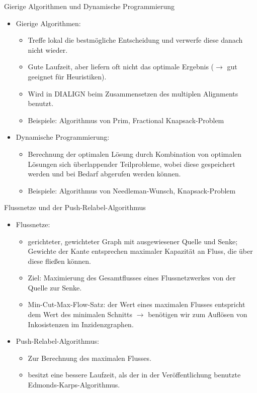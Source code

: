 \documentclass[wide,xcolor={x11names},hyperref={colorlinks=false},pantone312]{beamer}
\begin{document}
\begin{frame}[t]{Gierige Algorithmen und Dynamische Programmierung}
	\begin{itemize}
		\item Gierige Algorithmen:
		\begin{itemize}
			\item Treffe lokal die bestmögliche Entscheidung und verwerfe diese danach nicht wieder.
			\item Gute Laufzeit, aber liefern oft nicht das optimale Ergebnis ($\rightarrow$ gut geeignet für Heuristiken).
			\item Wird in DIALIGN beim Zusammensetzen des multiplen Alignments benutzt.
			\item Beispiele: Algorithmus von Prim, Fractional Knapsack-Problem
		\end{itemize} \pause
		\item Dynamische Programmierung:
		\begin{itemize}
			\item Berechnung der optimalen Lösung durch Kombination von optimalen Lösungen sich überlappender Teilprobleme, wobei diese gespeichert werden und bei Bedarf abgerufen werden können.
			\item Beispiele: Algorithmus von Needleman-Wunsch, Knapsack-Problem
		\end{itemize}
	\end{itemize}
\end{frame}

\begin{frame}[t]{Flussnetze und der Push-Relabel-Algorithmus}
	\begin{itemize}
		\item Flussnetze:
		\begin{itemize}
			\item gerichteter, gewichteter Graph mit ausgewiesener Quelle und Senke; Gewichte der Kante entsprechen maximaler Kapazität an Fluss, die über diese fließen können.
			\item Ziel: Maximierung des Gesamtflusses eines Flussnetzwerkes von der Quelle zur Senke.
			\item Min-Cut-Max-Flow-Satz: der Wert eines maximalen Flusses entspricht dem Wert des minimalen Schnitts $\rightarrow$ benötigen wir zum Auflösen von Inkosistenzen im Inzidenzgraphen.
		\end{itemize} \pause
		\item Push-Relabel-Algorithmus:
		\begin{itemize}
			\item Zur Berechnung des maximalen Flusses.
			\item besitzt eine bessere Laufzeit, als der in der Veröffentlichung benutzte Edmonds-Karps-Algorithmus.
		\end{itemize}
	\end{itemize}
\end{frame}
\end{document}
